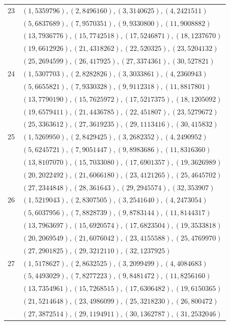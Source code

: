 \begin{longtable}{r p{}}
23 & $(1,5359796), (2,8496160), (3,3140625), (4,2421511)$ \\[2pt]
 & $(5,6837689), (7,9570351), (9,9330800), (11,9008882)$ \\[2pt]
 & $(13,7936776), (15,7742518), (17,5246871), (18,1237670)$ \\[2pt]
 & $(19,6612926), (21,4318262), (22,520325), (23,5204132)$ \\[2pt]
 & $(25,2694599), (26,417925), (27,3374361), (30,527821)$ \\[2pt]
24 & $(1,5307703), (2,8282826), (3,3033861), (4,2360943)$ \\[2pt]
 & $(5,6655821), (7,9330328), (9,9112318), (11,8817801)$ \\[2pt]
 & $(13,7790190), (15,7625972), (17,5217375), (18,1205092)$ \\[2pt]
 & $(19,6579411), (21,4436785), (22,451807), (23,5279672)$ \\[2pt]
 & $(25,3363612), (27,3619235), (29,1113416), (30,415832)$ \\[2pt]
25 & $(1,5269950), (2,8429425), (3,2682352), (4,2490952)$ \\[2pt]
 & $(5,6245721), (7,9051447), (9,8983686), (11,8316360)$ \\[2pt]
 & $(13,8107070), (15,7033080), (17,6901357), (19,3626989)$ \\[2pt]
 & $(20,2022492), (21,6066180), (23,4121265), (25,4645702)$ \\[2pt]
 & $(27,2344848), (28,361643), (29,2945574), (32,353907)$ \\[2pt]
26 & $(1,5219043), (2,8307505), (3,2541640), (4,2473054)$ \\[2pt]
 & $(5,6037956), (7,8828739), (9,8783144), (11,8144317)$ \\[2pt]
 & $(13,7963697), (15,6920574), (17,6823504), (19,3533818)$ \\[2pt]
 & $(20,2069549), (21,6076042), (23,4155588), (25,4769970)$ \\[2pt]
 & $(27,2901825), (29,3212110), (32,1237925)$ \\[2pt]
27 & $(1,5178627), (2,8632525), (3,2099499), (4,4084683)$ \\[2pt]
 & $(5,4493029), (7,8277223), (9,8481472), (11,8256160)$ \\[2pt]
 & $(13,7354961), (15,7268515), (17,6306482), (19,6150365)$ \\[2pt]
 & $(21,5214648), (23,4986099), (25,3218230), (26,800472)$ \\[2pt]
 & $(27,3872514), (29,1194911), (30,1362787), (31,2532046)$ \\[2pt]

\end{longtable}
